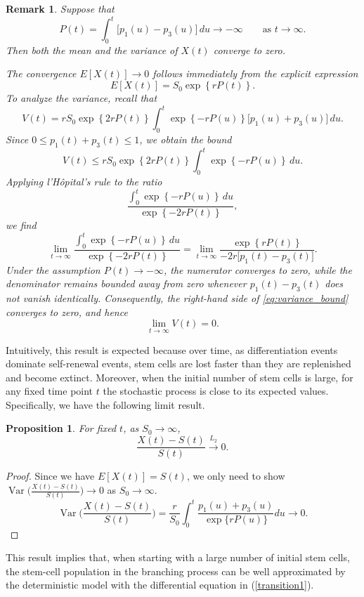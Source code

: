 \documentclass[pdflatex,sn-mathphys-num]{sn-jnl}
\theoremstyle{thmstyleone}%
\newtheorem{proposition}[theorem]{Proposition}%
\theoremstyle{thmstyletwo}%
\newtheorem{remark}{Remark}%
\theoremstyle{thmstylethree}%
\begin{document}
\begin{remark}
Suppose that
\[
P(t)=\int_0^t \bigl[p_1(u)-p_3(u)\bigr]\,du \longrightarrow -\infty
\qquad \text{as } t\to\infty.
\]
Then both the mean and the variance of $X(t)$ converge to zero.

The convergence $E[X(t)]\to0$ follows immediately from the explicit expression
\[
E[X(t)] = S_0 \exp\!\left\{ rP(t) \right\}.
\]
To analyze the variance, recall that
\[
V(t)
= r S_0 \exp\!\left\{ 2rP(t) \right\}
\int_0^t \exp\!\left\{ -rP(u) \right\}
\bigl[p_1(u)+p_3(u)\bigr]\,du.
\]
Since $0 \le p_1(t)+p_3(t)\le1$, we obtain the bound
\begin{equation}
\label{eq:variance_bound}
V(t)
\le r S_0 \exp\!\left\{ 2rP(t) \right\}
\int_0^t \exp\!\left\{ -rP(u) \right\}\,du.
\end{equation}
Applying l’Hôpital’s rule to the ratio
\[
\frac{\int_0^t \exp\!\left\{ -rP(u) \right\}\,du}
{\exp\!\left\{ -2rP(t) \right\}},
\]
we find
\[
\lim_{t\to\infty}
\frac{\int_0^t \exp\!\left\{ -rP(u) \right\}\,du}
{\exp\!\left\{ -2rP(t) \right\}}
=
\lim_{t\to\infty}
\frac{\exp\!\left\{ rP(t) \right\}}
{-2r\bigl[p_1(t)-p_3(t)\bigr]}.
\]
Under the assumption $P(t)\to-\infty$, the numerator converges to zero, while the denominator remains bounded away from zero whenever $p_1(t)-p_3(t)$ does not vanish identically. Consequently, the right-hand side of \eqref{eq:variance_bound} converges to zero, and hence
\[
\lim_{t\to\infty} V(t)=0.
\]
\end{remark}
Intuitively, this result is expected because over time, as differentiation events dominate self-renewal events, stem cells are lost faster than they are replenished and become extinct. Moreover, when the initial number of stem cells is large, for any fixed time point $t$ the stochastic process is close to its expected values. Specifically, we have the following limit result.
\begin{proposition}
For fixed $t$, as $S_0 \rightarrow \infty$,
\begin{equation}
    \frac{X(t) - S(t)}{S(t)} \xrightarrow{L_2} 0.
\end{equation}
\end{proposition}

\begin{proof} Since we have $E[X(t)] = S(t)$, we only need to show $\operatorname{Var}\Big( \frac{X(t) - S(t)}{S(t)} \Big) \longrightarrow 0$ as $ S_0 \longrightarrow \infty$.
\begin{equation}
    \operatorname{Var} \Big( \frac{X(t) - S(t)}{S(t)} \Big) = \frac{r}{S_0} \int_0^t \frac{p_1(u) + p_3(u)}{\exp \{ rP(u)\}} du \longrightarrow 0.
\end{equation}
\end{proof}
This result implies that, when starting with a large number of initial stem cells, the stem-cell population in the branching process can be well approximated by the deterministic model with the differential equation in (\ref{transition1}).
\end{document}
